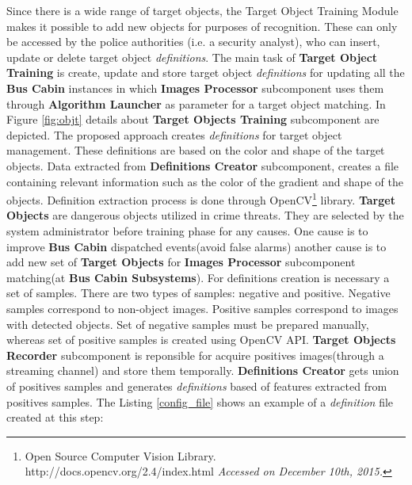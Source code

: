 Since there is a wide range of target objects, the Target Object Training Module makes it possible to add new objects for purposes of recognition. These can only be accessed by the police authorities (i.e. a security analyst), who can insert, update or delete target object \textit{definitions}. The main task of \textbf{Target Object Training} is create, update and store target object \textit{ definitions} for updating all the \textbf{Bus Cabin} instances in which \textbf{Images Processor} subcomponent uses them through \textbf{Algorithm Launcher} as parameter for a target object matching. In Figure \ref{fig:objt} details about \textbf{Target Objects Training} subcomponent are depicted. The proposed approach creates \textit{definitions} for target object management. These definitions are based on the color and shape of the target objects. Data extracted from \textbf{Definitions Creator} subcomponent, creates a file containing relevant information such as the color of the gradient and shape of the objects. Definition extraction process is done through OpenCV\footnote[22]{Open Source Computer Vision Library. 
http://docs.opencv.org/2.4/index.html \textit{Accessed on December 10th, 2015.}} library. \textbf{Target Objects} are dangerous objects utilized in crime threats. They are selected by the system administrator before training phase for any causes. One cause is to improve \textbf{Bus Cabin} dispatched events(avoid false alarms) another cause is to add new set of \textbf{Target Objects} for \textbf{Images Processor} subcomponent matching(at \textbf{Bus Cabin Subsystems}).
For definitions creation is necessary a set of samples. There are two types of samples: negative and positive. Negative samples correspond to non-object images. Positive samples correspond to images with detected objects. Set of negative samples must be prepared manually, whereas set of positive samples is created using OpenCV API. \textbf{Target Objects Recorder} subcomponent is reponsible for acquire positives images(through a streaming channel) and store them temporally. \textbf{Definitions Creator} gets union of positives samples and generates \textit{definitions} based of features extracted from positives samples. The Listing \ref{config_file} shows an example of a \textit{definition} file created at this step: 

